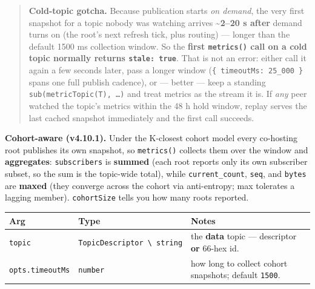 \documentclass[
  nobib]{tufte-handout}
\newcounter{none} %
\begin{document}
\begin{quote}
\textbf{Cold-topic gotcha.} Because publication starts \emph{on demand},
the very first snapshot for a topic nobody was watching arrives
\textbf{\textasciitilde2--20 s after} demand turns on (the root's next
refresh tick, plus routing) --- longer than the default 1500 ms
collection window. So the \textbf{first \texttt{metrics()} call on a
cold topic normally returns \texttt{stale:\ true}}. That is not an
error: either call it again a few seconds later, pass a longer window
(\texttt{\{\ timeoutMs:\ 25\_000\ \}} spans one full publish cadence),
or --- better --- keep a standing \texttt{sub(metricTopic(T),\ …)} and
treat metrics as the stream it is. If \emph{any} peer watched the
topic's metrics within the 48 h hold window, replay serves the last
cached snapshot immediately and the first call succeeds.
\end{quote}

\textbf{Cohort-aware (v4.10.1).} Under the K-closest cohort model every
co-hosting root publishes its own snapshot, so \texttt{metrics()}
collects them over the window and \textbf{aggregates}:
\texttt{subscribers} is \textbf{summed} (each root reports only its own
subscriber subset, so the sum is the topic-wide total), while
\texttt{current\_count}, \texttt{seq}, and \texttt{bytes} are
\textbf{maxed} (they converge across the cohort via anti-entropy; max
tolerates a lagging member). \texttt{cohortSize} tells you how many
roots reported.

{\def\LTcaptype{none} %
\begin{longtable}[]{@{}
  >{\raggedright\arraybackslash}p{}
  >{\raggedright\arraybackslash}p{}
  >{\raggedright\arraybackslash}p{}@{}}
\toprule\noalign{}
\begin{minipage}[b]{\linewidth}\raggedright
Arg
\end{minipage} & \begin{minipage}[b]{\linewidth}\raggedright
Type
\end{minipage} & \begin{minipage}[b]{\linewidth}\raggedright
Notes
\end{minipage} \\
\midrule\noalign{}
\endhead
\bottomrule\noalign{}
\endlastfoot
\texttt{topic} &
\texttt{TopicDescriptor\ \textbackslash{}\textbar{}\ string} & the
\textbf{data} topic --- descriptor \textbf{or} 66-hex id. \\
\texttt{opts.timeoutMs} & \texttt{number} & how long to collect cohort
snapshots; default \texttt{1500}. \\
\end{longtable}
}
\end{document}

